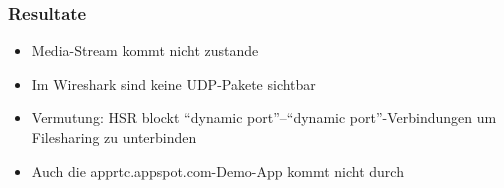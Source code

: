			\subsubsection{Resultate}
				\begin{itemize}
					\item Media-Stream kommt nicht zustande
					\item Im Wireshark sind keine UDP-Pakete sichtbar
					\item Vermutung: HSR blockt ``dynamic port''–``dynamic port''-Verbindungen
					um Filesharing zu unterbinden
					\item Auch die apprtc.appspot.com-Demo-App kommt nicht durch
				\end{itemize}
